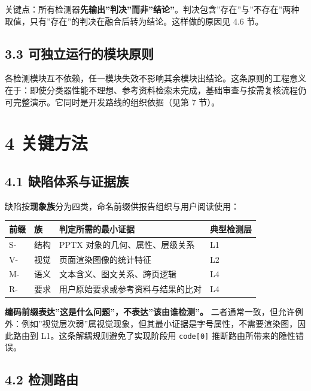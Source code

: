 \documentclass[
  11pt,
]{article}
\newcounter{none} %
\begin{document}
关键点：所有检测器\textbf{先输出''判决''而非''结论''}。判决包含''存在''与''不存在''两种取值，只有''存在''的判决在融合后转为结论。这样做的原因见
4.6 节。

\subsection{3.3
可独立运行的模块原则}\label{ux53efux72ecux7acbux8fd0ux884cux7684ux6a21ux5757ux539fux5219}

各检测模块互不依赖，任一模块失效不影响其余模块出结论。这条原则的工程意义在于：即使分类器性能不理想、参考资料检索未完成，基础审查与按需复核流程仍可完整演示。它同时是开发路线的组织依据（见第
7 节）。

\section{4 关键方法}\label{ux5173ux952eux65b9ux6cd5}

\subsection{4.1
缺陷体系与证据族}\label{ux7f3aux9677ux4f53ux7cfbux4e0eux8bc1ux636eux65cf}

缺陷按\textbf{现象族}分为四类，命名前缀供报告组织与用户阅读使用：

{\def\LTcaptype{none} %
\begin{longtable}[]{@{}llll@{}}
\toprule\noalign{}
前缀 & 族 & 判定所需的最小证据 & 典型检测层 \\
\midrule\noalign{}
\endhead
\bottomrule\noalign{}
\endlastfoot
S- & 结构 & PPTX 对象的几何、属性、层级关系 & L1 \\
V- & 视觉 & 页面渲染图像的统计特征 & L2 \\
M- & 语义 & 文本含义、图文关系、跨页逻辑 & L4 \\
R- & 要求 & 用户原始要求或参考资料与结果的比对 & L4 \\
\end{longtable}
}

\textbf{编码前缀表达''这是什么问题''，不表达''该由谁检测''。}
二者通常一致，但允许例外：例如''视觉层次弱''属视觉现象，但其最小证据是字号属性，不需要渲染图，因此路由到
L1。这条解耦规则避免了实现阶段用 \texttt{code{[}0{]}}
推断路由所带来的隐性错误。

\subsection{4.2 检测路由}\label{ux68c0ux6d4bux8defux7531}
\end{document}
